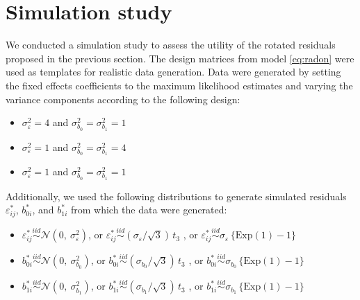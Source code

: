 \documentclass{article} %
\begin{document}
\section{Simulation study}\label{sec:simulation}

We conducted a simulation study to assess the utility of the rotated residuals proposed in the previous section. The design matrices from model \eqref{eq:radon} were used as templates for realistic data generation.
Data were generated by setting the fixed effects coefficients to the maximum likelihood estimates and varying the variance components according to the following design:
%
\begin{itemize}
\item $\sigma^2_\varepsilon = 4$ and  $\sigma^2_{b_0} = \sigma^2_{b_1} = 1$
\item $\sigma^2_\varepsilon = 1$ and  $\sigma^2_{b_0} = \sigma^2_{b_1} = 4$
\item $\sigma^2_\varepsilon = 1$ and  $\sigma^2_{b_0} = \sigma^2_{b_1} = 1$
\end{itemize}
%
Additionally, we used the following distributions to generate simulated residuals $\varepsilon_{ij}^*$, $b_{0i}^*$, and $b_{1i}^*$ from which the data were generated:
%
\begin{itemize}
\item $\varepsilon_{ij}^* \overset{iid}{\sim} \mathcal{N}(0, \ \sigma^2_{\varepsilon})$, or $\varepsilon_{ij}^* \overset{iid}{\sim} (\sigma_{\varepsilon} / \sqrt{3})\, t_3$ , or $\varepsilon_{ij}^* \overset{iid}{\sim} \sigma_{\varepsilon} \, \{ \text{Exp}(1) - 1 \}$

\item $b_{0i}^* \overset{iid}{\sim} \mathcal{N}(0, \ \sigma^2_{b_{0}})$, or $b_{0i}^* \overset{iid}{\sim} (\sigma_{b_{0}} / \sqrt{3})\, t_3$ , or $b_{0i}^* \overset{iid}{\sim} \sigma_{b_{0}} \, \{ \text{Exp}(1) - 1 \}$

\item $b_{1i}^* \overset{iid}{\sim} \mathcal{N}(0, \ \sigma^2_{b_{1}})$, or $b_{1i}^* \overset{iid}{\sim} (\sigma_{b_{1}} / \sqrt{3})\, t_3$ , or $b_{1i}^* \overset{iid}{\sim} \sigma_{b_{1}} \, \{ \text{Exp}(1) - 1 \}$
\end{itemize}
\end{document}
